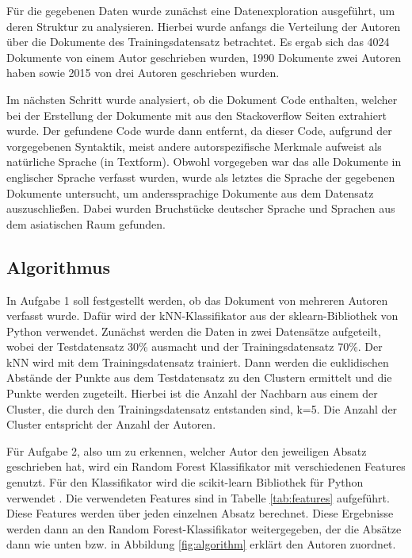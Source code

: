 \documentclass[conference]{IEEEtran}
\begin{document}
	
		Für die gegebenen Daten wurde zunächst eine Datenexploration ausgeführt, um deren Struktur zu analysieren. Hierbei wurde anfangs die Verteilung der Autoren über die Dokumente des Trainingsdatensatz betrachtet. Es ergab sich das 4024 Dokumente von einem Autor geschrieben wurden, 1990 Dokumente zwei Autoren haben sowie 2015 von drei Autoren geschrieben wurden.
		
		Im nächsten Schritt wurde analysiert, ob die Dokument Code enthalten, welcher bei der Erstellung der Dokumente mit aus den Stackoverflow Seiten extrahiert wurde. Der gefundene Code wurde dann entfernt, da dieser Code, aufgrund der vorgegebenen Syntaktik, meist andere autorspezifische Merkmale aufweist als natürliche Sprache (in Textform).
		Obwohl vorgegeben war das alle Dokumente in englischer Sprache verfasst wurden, wurde als letztes die Sprache der gegebenen Dokumente untersucht, um anderssprachige Dokumente aus dem Datensatz auszuschließen. Dabei wurden Bruchstücke deutscher Sprache und Sprachen aus dem asiatischen Raum gefunden.
		
\subsection{Algorithmus}
	
	In Aufgabe 1 soll festgestellt werden, ob das Dokument von mehreren Autoren verfasst wurde. Dafür wird der kNN-Klassifikator aus der sklearn-Bibliothek \cite{ma_b1} von Python verwendet. Zunächst werden die Daten in zwei Datensätze aufgeteilt, wobei der Testdatensatz 30\% ausmacht und der Trainingsdatensatz 70\%. Der kNN wird mit dem Trainingsdatensatz trainiert. Dann werden die euklidischen Abstände der Punkte aus dem Testdatensatz zu den Clustern ermittelt und die Punkte werden zugeteilt. Hierbei ist die Anzahl der Nachbarn aus einem der Cluster, die durch den Trainingsdatensatz entstanden sind, k=5. Die Anzahl der Cluster entspricht der Anzahl der Autoren.

	Für Aufgabe 2, also um zu erkennen, welcher Autor den jeweiligen Absatz geschrieben hat, wird ein Random Forest Klassifikator mit verschiedenen Features genutzt. Für den Klassifikator wird die scikit-learn Bibliothek für Python verwendet \cite{ma_b1}. Die verwendeten Features sind in Tabelle \ref{tab:features} aufgeführt. Diese Features werden über jeden einzelnen Absatz berechnet. Diese Ergebnisse werden dann an den Random Forest-Klassifikator weitergegeben, der die Absätze dann wie unten bzw. in Abbildung \ref{fig:algorithm} erklärt den Autoren zuordnet.
	
\end{document}
